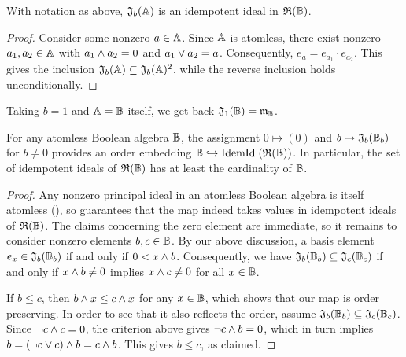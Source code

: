 \documentclass{amsart}
\begin{document}
    \begin{Lem}\label{lem:idempotentidealmachine}
        With notation as above, $\mathfrak{J}_{b}(\mathbb{A})$ is an idempotent ideal in $\mathfrak{R}(\mathbb{B})$.
    \end{Lem}
    \begin{proof}
        Consider some nonzero $a \in \mathbb{A}$. Since $\mathbb{A}$ is atomless, there exist nonzero  $a_1,a_2 \in \mathbb{A}$ with $a_1 \land a_2 = 0$ and $a_1 \lor a_2 = a$. Consequently, $e_a = e_{a_1}\cdot e_{a_2}$. This gives the inclusion $\mathfrak{J}_{b}(\mathbb{A}) \subseteq \mathfrak{J}_{b}(\mathbb{A})^2$, while the reverse inclusion holds unconditionally.
    \end{proof}
    
    \begin{Exa}
        Taking $b=1$ and $\mathbb{A} = \mathbb{B}$ itself, we get back $\mathfrak{J}_{1}(\mathbb{B}) = \mathfrak{m}_{\mathbb{B}}$.
    \end{Exa}
    
    \begin{Lem}\label{lem:idempotentidealmachine2}
        For any atomless Boolean algebra $\mathbb{B}$, the assignment $0 \mapsto (0)$ and $b \mapsto \mathfrak{J}_{b}(\mathbb{B}_b)$ for $b \ne 0$ provides an order embedding $\mathbb{B} \hookrightarrow \mathrm{IdemIdl}(\mathfrak{R}(\mathbb{B}))$. In particular, the set of idempotent ideals of $\mathfrak{R}(\mathbb{B})$ has at least the cardinality of  $\mathbb{B}$.
    \end{Lem}
    \begin{proof}
        Any nonzero principal ideal in an atomless Boolean algebra is itself atomless (), so  guarantees that the map indeed takes values in idempotent ideals of $\mathfrak{R}(\mathbb{B})$. The claims concerning the zero element are immediate, so it remains to consider nonzero elements $b,c\in\mathbb{B}$. By our above discussion, a basis element $e_x \in \mathfrak{J}_{b}(\mathbb{B}_b)$ if and only if $0 < x \land b$. Consequently, we have $\mathfrak{J}_{b}(\mathbb{B}_b) \subseteq \mathfrak{J}_{c}(\mathbb{B}_c)$ if and only if $x \land b \neq 0$ implies $x \land c \neq 0$ for all $x \in \mathbb{B}$.
    
        If $b \leq c$, then $b \land x \leq c \land x$ for any $x \in \mathbb{B}$, which shows that our map is order preserving. In order to see that it also reflects the order, assume $\mathfrak{J}_{b}(\mathbb{B}_b) \subseteq \mathfrak{J}_{c}(\mathbb{B}_c)$. Since $\lnot c \land c = 0$, the criterion above gives $\lnot c \land b = 0$, which in turn implies $b = (\lnot c \lor c) \land b = c \land b$. This gives $b \leq c$, as claimed.
    \end{proof}
    
\end{document}
